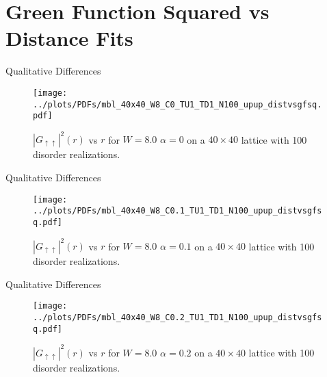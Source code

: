 \documentclass[]{beamer}
\begin{document}
\section{Green Function Squared vs Distance Fits}
\begin{frame}{Qualitative Differences}
    \begin{figure}
        \centering
        \texttt{[image: ../plots/PDFs/mbl\_40x40\_W8\_C0\_TU1\_TD1\_N100\_upup\_distvsgfsq.pdf]}
        \caption{$|G_{\uparrow\uparrow}|^2(r)$ vs $r$ for $W = 8.0$ $\alpha = 0$ on a $40\times40$
                lattice with 100 disorder realizations.}
    \end{figure}        
\end{frame}

\begin{frame}{Qualitative Differences}
    \begin{figure}
        \centering
        \texttt{[image: ../plots/PDFs/mbl\_40x40\_W8\_C0.1\_TU1\_TD1\_N100\_upup\_distvsgfsq.pdf]}
        \caption{$|G_{\uparrow\uparrow}|^2(r)$ vs $r$ for $W = 8.0$ $\alpha = 0.1$ on a $40\times40$
                lattice with 100 disorder realizations.}
    \end{figure}        
\end{frame}

\begin{frame}{Qualitative Differences}
    \begin{figure}
        \centering
        \texttt{[image: ../plots/PDFs/mbl\_40x40\_W8\_C0.2\_TU1\_TD1\_N100\_upup\_distvsgfsq.pdf]}
        \caption{$|G_{\uparrow\uparrow}|^2(r)$ vs $r$ for $W = 8.0$ $\alpha = 0.2$ on a $40\times40$
                lattice with 100 disorder realizations.}
    \end{figure}        
\end{frame}
\end{document}
